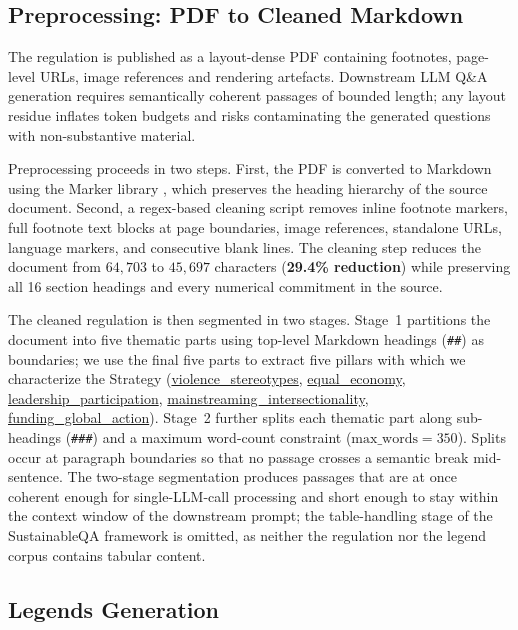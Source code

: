 \documentclass[pdflatex, sn-apa]{sn-jnl}%
\theoremstyle{thmstyleone}%
\theoremstyle{thmstyletwo}%
\theoremstyle{thmstylethree}%
\begin{document}
\subsection{Preprocessing: PDF to Cleaned Markdown}
\label{sec:method:preprocess}

The regulation is published as a layout-dense PDF containing footnotes,
page-level URLs, image references and rendering artefacts. Downstream LLM Q\&A
generation requires semantically coherent passages of bounded length; any layout
residue inflates token budgets and risks contaminating the generated questions
with non-substantive material.

Preprocessing proceeds in two steps. First, the PDF is converted to Markdown
using the Marker library \citep{paruchuri2024marker}, which preserves the
heading hierarchy of the source document. Second, a regex-based cleaning script
removes inline footnote markers, full footnote text blocks at page boundaries,
image references, standalone URLs, language markers, and consecutive blank
lines.  
The cleaning step reduces the document from $64{,}703$ to $45{,}697$ characters
(\textbf{29.4\% reduction}) while preserving all 16 section headings and every
numerical commitment in the source.

The cleaned regulation is then segmented in two stages. Stage~1 partitions the
document into five thematic parts using top-level Markdown headings
({\small\texttt{\#\#}}) as boundaries; we use the final five parts to extract
five pillars with which we characterize the Strategy (\url{violence_stereotypes},
\url{equal_economy}, \url{leadership_participation},
\url{mainstreaming_intersectionality}, \url{funding_global_action}). Stage~2
further splits each thematic part along sub-headings ({\small\texttt{\#\#\#}})
and a maximum word-count constraint ($\text{max\_words} = 350$). Splits occur at
paragraph boundaries so that no passage crosses a semantic break mid-sentence.
The two-stage segmentation produces passages that are at once coherent enough
for single-LLM-call processing and short enough to stay within the context
window of the downstream prompt; the table-handling stage of the SustainableQA
framework is omitted, as neither the regulation nor the legend corpus contains
tabular content.

\subsection{Legends Generation}
\label{sec:method:legends}
\end{document}
